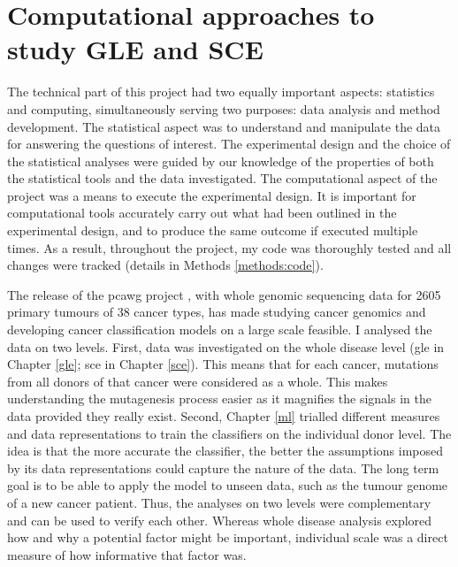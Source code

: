 


\section{Computational approaches to study GLE and SCE}
\label{intro:ml}

The technical part of this project had two equally important aspects: statistics and computing, simultaneously serving two purposes: data analysis and method development. The statistical aspect was to understand and manipulate the data for answering the questions of interest. The experimental design and the choice of the statistical analyses were guided by our knowledge of the properties of both the statistical tools and the data investigated. The computational aspect of the project was a means to execute the experimental design. It is important for computational tools accurately carry out what had been outlined in the experimental design, and to produce the same outcome if executed multiple times. As a result, throughout the project, my code was thoroughly tested and all changes were tracked (details in Methods \ref{methods:code}). 

The release of the \gls{pcawg} project \citep{Campbell2020}, with whole genomic sequencing data for 2605 primary tumours of 38 cancer types, has made studying cancer genomics and developing cancer classification models on a large scale feasible. I analysed the data on two levels. First, data was investigated on the whole disease level (\gls{gle} in Chapter \ref{gle}; \gls{sce} in Chapter \ref{sce}). This means that for each cancer, mutations from all donors of that cancer were considered as a whole. This makes understanding the mutagenesis process easier as it magnifies the signals in the data provided they really exist. Second, Chapter \ref{ml} trialled different measures and data representations to train the classifiers on the individual donor level. The idea is that the more accurate the classifier, the better the assumptions imposed by its data representations could capture the nature of the data. The long term goal is to be able to apply the model to unseen data, such as the tumour genome of a new cancer patient. Thus, the analyses on two levels were complementary and can be used to verify each other. Whereas whole disease analysis explored how and why a potential factor might be important, individual scale was a direct measure of how informative that factor was.  

